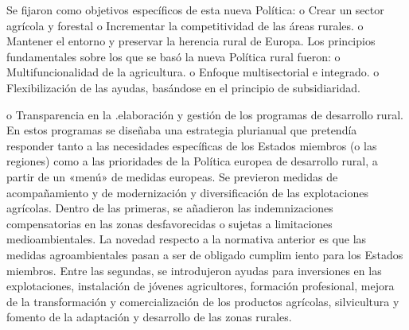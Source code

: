 \documentclass[10pt,a4paper]{article}
\begin{document}
Se fijaron como objetivos específicos de esta nueva Política: o Crear un sector agrícola y forestal o Incrementar la competitividad de las áreas rurales. o Mantener el entorno y preservar la herencia rural de Europa. Los principios fundamentales sobre los que se basó la nueva Política rural fueron: o Multifuncionalidad de la agricultura. o Enfoque multisectorial e integrado. o Flexibilización de las ayudas, basándose en el principio de subsidiaridad.

o Transparencia en la .elaboración y gestión de los programas de desarrollo rural. En estos programas se diseñaba una estrategia plurianual que pretendía responder tanto a las necesidades específicas de los Estados miembros (o las regiones) como a las prioridades de la Política europea de desarrollo rural, a partir de un «menú» de medidas europeas. Se previeron medidas de acompañamiento y de modernización y diversificación de las explotaciones agrícolas. Dentro de las primeras, se añadieron las indemnizaciones compensatorias en las zonas desfavorecidas o sujetas a limitaciones medioambientales. La novedad respecto a la normativa anterior es que las medidas agroambientales pasan a ser de obligado cumplim iento para los Estados miembros. Entre las segundas, se introdujeron ayudas para inversiones en las explotaciones, instalación de jóvenes agricultores, formación profesional, mejora de la transformación y comercialización de los productos agrícolas, silvicultura y fomento de la adaptación y desarrollo de las zonas rurales. 
\end{document}
